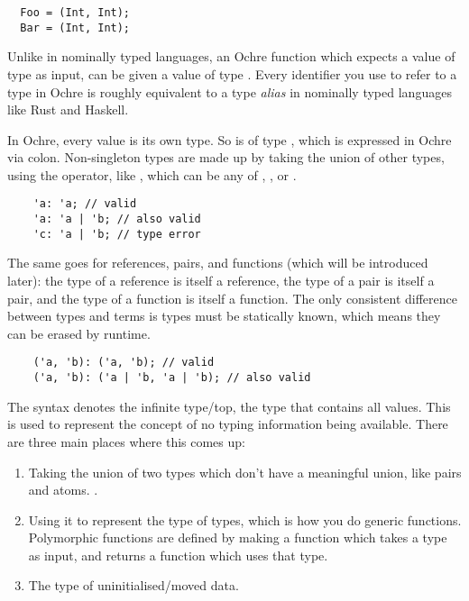 \documentclass[12pt,twoside]{report}
\begin{document}
\begin{verbatim}
  Foo = (Int, Int);
  Bar = (Int, Int);
\end{verbatim}

Unlike in nominally typed languages, an Ochre function which expects a value of type  as input, can be given a value of type . Every identifier you use to refer to a type in Ochre is roughly equivalent to a type \textit{alias} in nominally typed languages like Rust and Haskell.

In Ochre, every value is its own type. So  is of type , which is expressed in Ochre via colon. Non-singleton types are made up by taking the union of other types, using the \mono{|} operator, like , which can be any of , , or .

  \begin{verbatim}
    'a: 'a; // valid
    'a: 'a | 'b; // also valid
    'c: 'a | 'b; // type error
  \end{verbatim}

The same goes for references, pairs, and functions (which will be introduced later): the type of a reference is itself a reference, the type of a pair is itself a pair, and the type of a function is itself a function. The only consistent difference between types and terms is types must be statically known, which means they can be erased by runtime.

  \begin{verbatim}
    ('a, 'b): ('a, 'b); // valid
    ('a, 'b): ('a | 'b, 'a | 'b); // also valid
  \end{verbatim}

The \mono{*} syntax denotes the infinite type/top, the type that contains all values. This is used to represent the concept of no typing information being available. There are three main places where this comes up:

\begin{enumerate}
  \item Taking the union of two types which don't have a meaningful union, like pairs and atoms. .
  \item Using it to represent the type of types, which is how you do generic functions. Polymorphic functions are defined by making a function which takes a type as input, and returns a function which uses that type.
  \item The type of uninitialised/moved data.
\end{enumerate}
\end{document}
